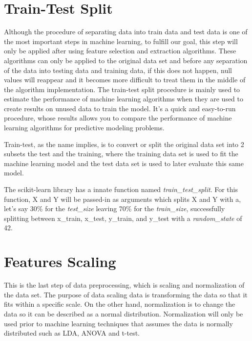 \section{Train-Test Split} %
\label{sec:test_train_split}
\hspace{10px}Although the procedure of separating data into train data and test data is one of the most important steps in machine learning, to fulfill our goal, this step will only be applied after using feature selection and extraction algorithms. These algorithms can only be applied to the original data set and before any separation of the data into testing data and training data, if this does not happen, null values will reappear and it becomes more difficult to treat them in the middle of the algorithm implementation. The train-test split procedure is mainly used to estimate the performance of machine learning algorithms when they are used to create results on unused data to train the model. It's a quick and easy-to-run procedure, whose results allows you to compare the performance of machine learning algorithms for predictive modeling problems.

Train-test, as the name implies, is to convert or split the original data set into 2 subsets the test and the training, where the training data set is used to fit the machine learning model and the test data set is used to later evaluate this same model.

The scikit-learn library has a innate function named \textit{train\_test\_split}. For this function, X and Y will be passed-in as arguments which splits X and Y with a, let's say 30\% for the \textit{test\_size} leaving 70\% for the \textit{train\_size}, successfully splitting between x\_train, x\_test, y\_train, and y\_test with a \textit{random\_state} of 42.


\section{Features Scaling} %
\label{sec:feature_scaling}
\hspace{10px} This is the last step of data preprocessing, which is scaling and normalization of the data set. The purpose of data scaling data is transforming the data so that it fits within a specific scale. On the other hand, normalization is to change the data so it can be described as a normal distribution. Normalization will only be used prior to machine learning techniques that assumes the data is normally distributed such as LDA, ANOVA and t-test.

